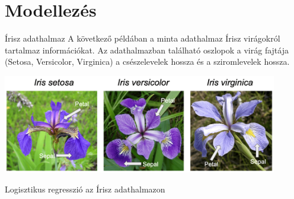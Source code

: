\documentclass[english, aspectratio=169]{beamer}
\makeatletter
\let\origtableofcontents=\tableofcontents
\def\tableofcontents{\@ifnextchar[{\origtableofcontents}{\gobbletableofcontents}}
\def\gobbletableofcontents#1{\origtableofcontents}
\makeatother
\begin{document}
\section{Modellezés}

\begin{frame}
\tableofcontents[currentsection]
\end{frame}

\begin{frame}{Írisz adathalmaz}
A következő példában a minta adathalmaz Írisz virágokról tartalmaz információkat. Az adathalmazban található oszlopok a virág fajtája (Setosa, Versicolor, Virginica) a csészelevelek hossza és a sziromlevelek hossza. 
\begin{center}
\includegraphics[width=12cm, keepaspectratio]{images/osztalyozas_19.png}
\end{center}
\end{frame}

\begin{frame}{Logisztikus regresszió az Írisz adathalmazon}
\begin{columns}
\begin{column}{.5\textwidth}

\end{column}
\begin{column}{.5\textwidth}

\end{column}
\end{columns}
\end{frame}
\end{document}

